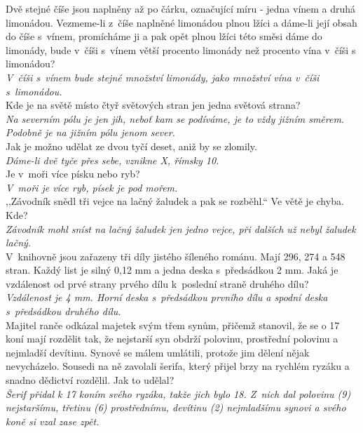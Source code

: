 \begin{multicols}{\value{columnsgames}}
\noindent
Dvě stejné číše jsou naplněny až po čárku, označující 
míru - jedna vínem a druhá limonádou. Vezmeme-li z~číše 
naplněné limonádou plnou lžíci a dáme-li její obsah do číše s~vínem, 
promícháme ji a pak opět plnou lžíci této směsi dáme do limonády, 
bude v~číši s~vínem větší procento limonády než 
procento vína v~číši s limonádou?\\[1 mm]
{\sl V~číši s~vínem bude stejné množství limonády,
jako množství vína v~číši s~limonádou.}\\

\noindent
Kde je na světě místo čtyř světových stran jen jedna 
světová strana?\\[1 mm]
{\sl Na severním pólu je jen jih, neboť kam se podíváme, je to 
vždy jižním směrem. Podobně je na jižním pólu jenom sever.}\\

\noindent
Jak je možno udělat ze dvou tyčí deset, aniž by se zlomily.\\[1 mm]
{\sl Dáme-li dvě tyče přes sebe, vznikne X, římsky 10.}\\

\noindent
Je v~moři více písku nebo ryb?\\[1 mm]
{\sl V~moři je více ryb, písek je pod mořem.}\\

\noindent
,,Závodník snědl tři vejce na lačný žaludek a pak se rozběhl.`` 
Ve větě je chyba. Kde?\\[1 mm]
{\sl Závodník mohl sníst na lačný žaludek jen jedno vejce, při
dalších už nebyl žaludek lačný.}\\

\noindent
V~knihovně jsou zařazeny tři díly jistého šíleného 
románu. Mají 296, 274 a 548 stran. Každý list je silný 0,12 mm 
a jedna deska s~předsádkou 2 mm. Jaká je vzdálenost od 
prvé strany prvého dílu k~poslední straně druhého dílu?\\[1 mm]
{\sl Vzdálenost je 4 mm. Horní deska s~předsádkou prvního 
dílu a spodní deska s~předsádkou druhého dílu.}\\

\noindent
Majitel ranče odkázal majetek svým třem synům, přičemž 
stanovil, že se o 17 koní mají rozdělit tak, že nejstarší syn 
obdrží polovinu, prostřední polovinu a nejmladší devítinu. Synové 
se málem umlátili, protože jim dělení nějak nevycházelo. Sousedi 
na ně zavolali šerifa, který přijel brzy na rychlém ryzáku a 
snadno dědictví rozdělil. Jak to udělal?\\[1 mm]
{\sl Šerif přidal k 17 koním svého ryzáka, takže jich bylo 18. 
Z~nich dal polovinu (9) nejstaršímu, třetinu (6) prostřednímu,
devítinu (2) nejmladšímu synovi a svého koně si vzal zase zpět.}\\


\end{multicols}
